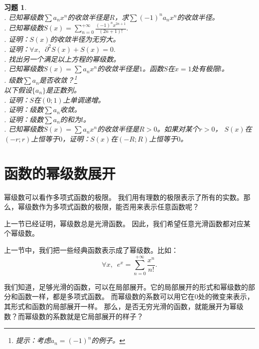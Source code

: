\documentclass[12pt,UTF8]{ctexbook}
\theoremstyle{definition}
\theoremstyle{plain}
\newtheorem{xt}{习题}[section]
\begin{document}
\begin{xt}    
    \mbox{} \\
    . 已知幂级数$\sum a_n x^n$的收敛半径是$R$，求$\sum (-1)^n a_n x^n$的收敛半径。\\
    . 已知幂级数$S(x) = \sum_{n=0}^{+\infty} \frac{(-1)^n x^{2n+1}}{(2n+1)!}. $\\
    . 证明：$S(x)$的收敛半径为无穷大。\\
    . 证明：$\forall x,\,\,\,\partial^2 S(x) + S(x) = 0.$ \\
    . 找出另一个满足以上方程的幂级数。\\
    . 已知幂级数$S(x) = \sum a_n x^n$的收敛半径是$1$。函数$S$在$x=1$处有极限$l$。\\
    . 级数$\sum a_n$是否收敛？\footnote{提示：考虑$a_n = (-1)^n$的例子。}\\
    \indent 以下假设$\{a_n\}$是正数列。\\
    . 证明：$S$在$(0;1)$上单调递增。\\
    . 证明：级数$\sum a_n$收敛。\\
    . 证明：级数$\sum a_n$的和为$l$。\\
    . 已知幂级数$S(x) = \sum a_n x^n$的收敛半径是$R>0$。如果对某个$r>0$，
    $S(x)$在$(-r;r)$上恒等于$0$，证明：$S(x)$在$(-R;R)$上恒等于$0$。
\end{xt}

\section{函数的幂级数展开}

幂级数可以看作多项式函数的极限。
我们用有理数的极限表示了所有的实数。那么，幂级数作为多项式函数的极限，能否用来表示任意函数呢？

上一节已经证明，幂级数总是光滑函数。
因此，我们希望任意光滑函数都对应某个幂级数。

上一节中，我们把一些经典函数表示成了幂级数。比如：
$$ \forall x, \,\,\, e^x = \sum_{n=0}^{+\infty} \frac{x^n}{n!}. $$

我们知道，足够光滑的函数，可以在局部展开。它的局部展开的形式和幂级数的部分和函数一样，都是多项式函数。
而幂级数的系数可以用它在$0$处的微变来表示，其形式和函数的局部展开一样。
那么，是否无穷光滑的函数，就能展开为幂级数？而幂级数的系数就是它局部展开的样子？
\end{document}
